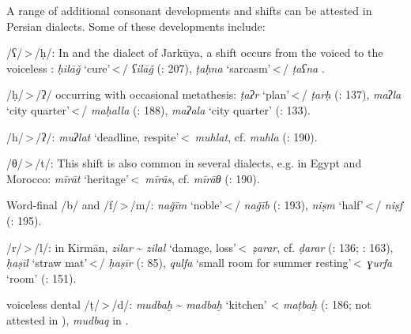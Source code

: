 \documentclass[output=paper]{langsci/langscibook}
\begin{document}

A range of additional consonant developments and shifts can be attested in Persian dialects. Some of these developments include:

\begin{altdescription}
\item[/ʕ/\,>\,/ḥ/:] In  and the dialect of Jarkūya, a shift occurs from the voiced to the voiceless : \textit{ḥilāǧ} ‘cure’\,<\,/ \textit{ʕilāǧ} (\citealt{Īzadpanāh2001}: 207), \textit{ṭaḥna} ‘sarcasm’\,<\,/ \textit{ṭaʕna} \citep{Borjian2008}.

\item[/ḥ/\,>\,/ʔ/ occurring with occasional metathesis:] \textit{ṭaʔr} ‘plan’\,<\,/ \textit{ṭarḥ} (\citealt{Ṣarrāfī1996}: 137), \textit{maʔla} ‘city quarter’\,<\,\slash{} \textit{maḥalla} (\citealt{Ṣarrāfī1996}: 188), \textit{maʔala} ‘city quarter’ (\citealt{NaǧībiFīni2002}: 133).

\item[/h/\,>\,/ʔ/:] \textit{muʔlat} ‘deadline, respite’\,<\, \textit{muhlat}, cf.  \textit{muhla} (\citealt{Ṣarrāfī1996}: 190).

\item[/θ/\,>\,/t/:] This shift is also common in several  dialects, e.g. in Egypt and Morocco: \textit{mīrāt} ‘heritage’\,<\, \textit{mīrās}, cf.  \textit{mīrāθ} (\citealt{Īzadpanāh2001}: 190).

\item[Word-final /b/ and /f/\,>\,/m/:] \textit{naǧīm} ‘noble’\,<\,/ \textit{naǧīb} (\citealt{Īzadpanāh2001}: 193), \textit{niṣm} ‘half’\,<\,\slash{} \textit{niṣf} (\citealt{Īzadpanāh2001}: 195).

\item[/r/\,>\,/l/:] in Kirmān, \textit{zilar} \~{} \textit{zilal} ‘damage, loss’\,<\, \textit{ẓarar}, cf.  \textit{ḍarar} (\citealt{Ṣarrāfī1996}: 136; \citealt{Dānišgar1995}: 163), \textit{ḥaṣīl} ‘straw mat’\,<\,/ \textit{ḥaṣīr} (\citealt{Ṣarrāfī1996}: 85), \textit{qulfa} ‘small room for summer resting’\,<\, \textit{ɣurfa} ‘room’ (\citealt{Fāẓilī2004}: 151).

\item[\ili{Arabic} voiceless dental \isi{emphatic} /ṭ/\,>\,/d/:] \textit{mudbaḫ} \~{} \textit{madbaḫ} ‘kitchen’ <  \textit{maṭbaḫ} (\citealt{Ṣarrāfī1996}: 186; not attested in ), \textit{mudbaq} in  \citep[251]{Sarlak2002}.


\end{altdescription}
\end{document}
